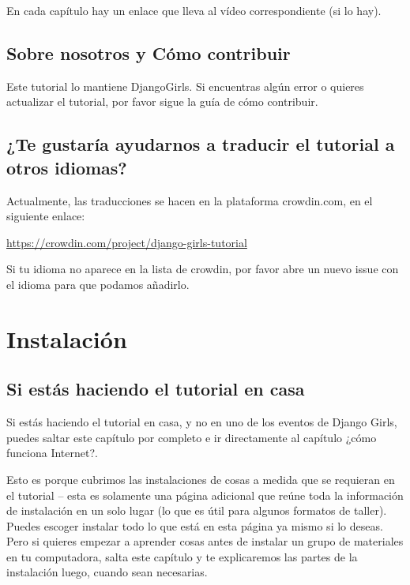 \documentclass[
  a4paper,
  DIV=11,
  numbers=noendperiod,
  onepage,
  openany]{scrreprt}
\begin{document}
En cada capítulo hay un enlace que lleva al vídeo correspondiente (si lo
hay).

\chapter{Sobre nosotros y Cómo
contribuir}\label{sobre-nosotros-y-cuxf3mo-contribuir}

Este tutorial lo mantiene DjangoGirls. Si encuentras algún error o
quieres actualizar el tutorial, por favor sigue la guía de cómo
contribuir.

\chapter{¿Te gustaría ayudarnos a traducir el tutorial a otros
idiomas?}\label{te-gustaruxeda-ayudarnos-a-traducir-el-tutorial-a-otros-idiomas}

Actualmente, las traducciones se hacen en la plataforma crowdin.com, en
el siguiente enlace:

\url{https://crowdin.com/project/django-girls-tutorial}

Si tu idioma no aparece en la lista de crowdin, por favor abre un nuevo
issue con el idioma para que podamos añadirlo.

\part{Instalación}

\chapter{Si estás haciendo el tutorial en
casa}\label{si-estuxe1s-haciendo-el-tutorial-en-casa}

Si estás haciendo el tutorial en casa, y no en uno de los eventos de
Django Girls, puedes saltar este capítulo por completo e ir directamente
al capítulo ¿cómo funciona Internet?.

Esto es porque cubrimos las instalaciones de cosas a medida que se
requieran en el tutorial -- esta es solamente una página adicional que
reúne toda la información de instalación en un solo lugar (lo que es
útil para algunos formatos de taller). Puedes escoger instalar todo lo
que está en esta página ya mismo si lo deseas. Pero si quieres empezar a
aprender cosas antes de instalar un grupo de materiales en tu
computadora, salta este capítulo y te explicaremos las partes de la
instalación luego, cuando sean necesarias.
\end{document}
